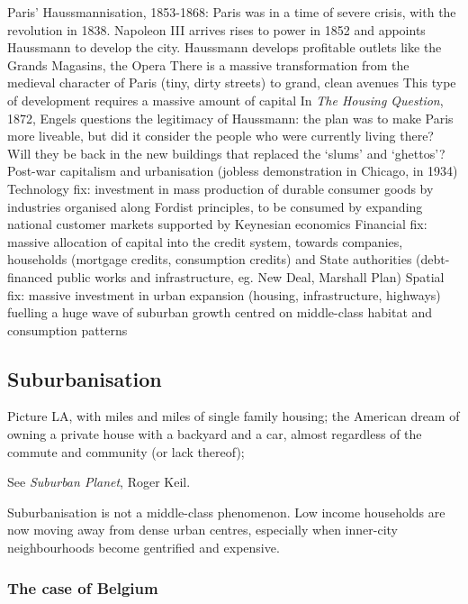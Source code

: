 \documentclass{article}
\begin{document}
\begin{outline}
	\1 Paris' Haussmannisation, 1853-1868: Paris was in a time of severe crisis, with the revolution in 1838. Napoleon III arrives rises to power in 1852 and appoints Haussmann to develop the city. 
		\2 Haussmann develops profitable outlets like the Grands Magasins, the Opera
		\2 There is a massive transformation from the medieval character of Paris (tiny, dirty streets) to grand, clean avenues
		\2 This type of development requires a massive amount of capital
		\2 In \textit{The Housing Question}, 1872, Engels questions the legitimacy of Haussmann: the plan was to make Paris more liveable, but did it consider the people who were currently living there? Will they be back in the new buildings that replaced the `slums' and `ghettos'?
	\1 Post-war capitalism and urbanisation (jobless demonstration in Chicago, in 1934)
		\2 Technology fix: investment in mass production of durable consumer goods by industries organised along Fordist principles, to be consumed by expanding national customer markets supported by Keynesian economics
		\2 Financial fix: massive allocation of capital into the credit system, towards companies, households (mortgage credits, consumption credits) and State authorities (debt-financed public works and infrastructure, eg. New Deal, Marshall Plan)
		\2 Spatial fix: massive investment in urban expansion (housing, infrastructure, highways) fuelling a huge wave of suburban growth centred on middle-class habitat and consumption patterns
\end{outline}

\subsection{Suburbanisation}

Picture LA, with miles and miles of single family housing; the American dream of owning a private house with a backyard and a car, almost regardless of the commute and community (or lack thereof);

See \textit{Suburban Planet}, Roger Keil.

Suburbanisation is not a middle-class phenomenon. Low income households are now moving away from dense urban centres, especially when inner-city neighbourhoods become gentrified and expensive.

\subsubsection{The case of Belgium}
\end{document}
